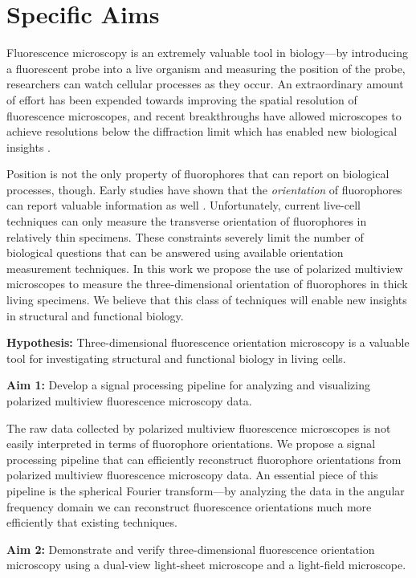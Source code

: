 \documentclass[12pt]{article}
\begin{document}
\section*{Specific Aims}
Fluorescence microscopy is an extremely valuable tool in
biology---by introducing a fluorescent probe into a live organism and measuring
the position of the probe, researchers can watch cellular processes as they
occur. An extraordinary amount of effort has been expended towards improving the
spatial resolution of fluorescence microscopes, and recent breakthroughs have
allowed microscopes to achieve resolutions below the diffraction limit which has
enabled new biological insights \cite{nobel}.

Position is not the only property of fluorophores that can report on biological
processes, though. Early studies have shown that the \textit{orientation} of
fluorophores can report valuable information as well
\cite{weiss1999}. Unfortunately, current live-cell techniques can only measure
the transverse orientation of fluorophores in relatively thin specimens. These
constraints severely limit the number of biological questions that can be
answered using available orientation measurement techniques. In this work we
propose the use of polarized multiview microscopes to measure the
three-dimensional orientation of fluorophores in thick living specimens. We
believe that this class of techniques will enable new insights in structural and
functional biology.

\noindent\textbf{Hypothesis:} Three-dimensional fluorescence orientation microscopy is a
valuable tool for investigating structural and functional biology in living
cells.

\noindent\textbf{Aim 1:} Develop a signal processing pipeline for analyzing and visualizing polarized multiview fluorescence microscopy data.

The raw data collected by polarized multiview fluorescence microscopes is not
easily interpreted in terms of fluorophore orientations. We propose a signal
processing pipeline that can efficiently reconstruct fluorophore orientations
from polarized multiview fluorescence microscopy data. An essential piece of
this pipeline is the spherical Fourier transform---by analyzing the data in the
angular frequency domain we can reconstruct fluorescence orientations much more
efficiently that existing techniques.

\noindent\textbf{Aim 2:} Demonstrate and verify three-dimensional fluorescence
orientation microscopy using a dual-view light-sheet microscope and a
light-field microscope.
\end{document}
